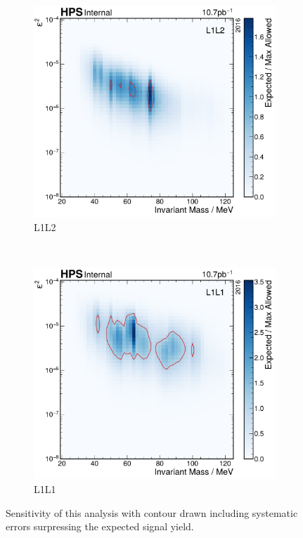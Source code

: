 \begin{figure}
  \centering
  \begin{subfigure}{0.48\textwidth}
    \includegraphics[width=\textwidth]{figures/hps/analysis/results/exclusion-estimate.pdf}
    \caption{L1L2}
    \label{fig:sensitivity:l1l2}
  \end{subfigure}
  ~
  \begin{subfigure}{0.48\textwidth}
    \includegraphics[width=\textwidth]{figures/hps/analysis/results/l1l1-exclusion-estimate.pdf}
    \caption{L1L1}
    \label{fig:sensitivity:l1l1}
  \end{subfigure}
  \caption{Sensitivity of this analysis with contour drawn including systematic errors
  surpressing the expected signal yield.}
  \label{fig:sensitivity}
\end{figure}
